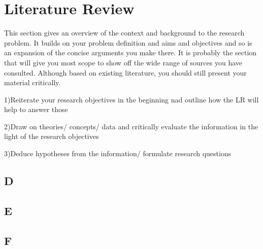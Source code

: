 \chapter{Literature Review}\label{ch:literaturereview}

This section gives an overview of the context and background to the research problem.
It builds on your problem definition and aims and objectives and so is an expansion of the concise arguments you make there.
It is probably the section that will give you most scope to show off the wide range of sources you have consulted.
Although based on existing literature, you should still present your material critically.

1)Reiterate your research objectives in the beginning nad outline how the LR will help to answer those

2)Draw on theories/ concepts/ data and critically evaluate the information in the light of the research objectives

3)Deduce hypotheses from the information/ formulate research questions


\section{D}\label{sec:D}
\lipsum[1-5]

\section{E}\label{sec:E}
\lipsum[1-5]

\section{F}\label{sec:F}
\lipsum[1-5]